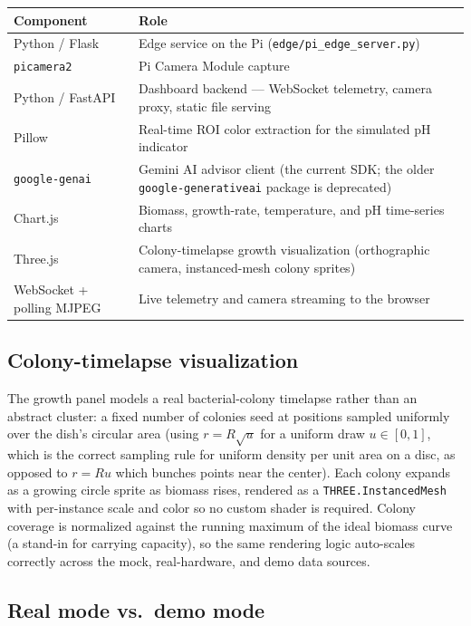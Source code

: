\documentclass[11pt]{article}
\begin{document}
\begin{center}
\begin{tabular}{@{}p{3.6cm}p{9.9cm}@{}}
\toprule
\textbf{Component} & \textbf{Role} \\
\midrule
Python / Flask & Edge service on the Pi (\texttt{edge/pi\_edge\_server.py}) \\
\texttt{picamera2} & Pi Camera Module capture \\
Python / FastAPI & Dashboard backend --- WebSocket telemetry, camera proxy, static file serving \\
Pillow & Real-time ROI color extraction for the simulated pH indicator \\
\texttt{google-genai} & Gemini AI advisor client (the current SDK; the older \texttt{google-generativeai} package is deprecated) \\
Chart.js & Biomass, growth-rate, temperature, and pH time-series charts \\
Three.js & Colony-timelapse growth visualization (orthographic camera, instanced-mesh colony sprites) \\
WebSocket + polling MJPEG & Live telemetry and camera streaming to the browser \\
\bottomrule
\end{tabular}
\end{center}

\subsection{Colony-timelapse visualization}

The growth panel models a real bacterial-colony timelapse rather than an abstract cluster: a fixed number of colonies seed at positions sampled uniformly over the dish's circular area (using \(r = R\sqrt{u}\) for a uniform draw \(u \in [0,1]\), which is the correct sampling rule for uniform density per unit area on a disc, as opposed to \(r = Ru\) which bunches points near the center). Each colony expands as a growing circle sprite as biomass rises, rendered as a \texttt{THREE.InstancedMesh} with per-instance scale and color so no custom shader is required. Colony coverage is normalized against the running maximum of the ideal biomass curve (a stand-in for carrying capacity), so the same rendering logic auto-scales correctly across the mock, real-hardware, and demo data sources.

\subsection{Real mode vs.\ demo mode}
\end{document}
